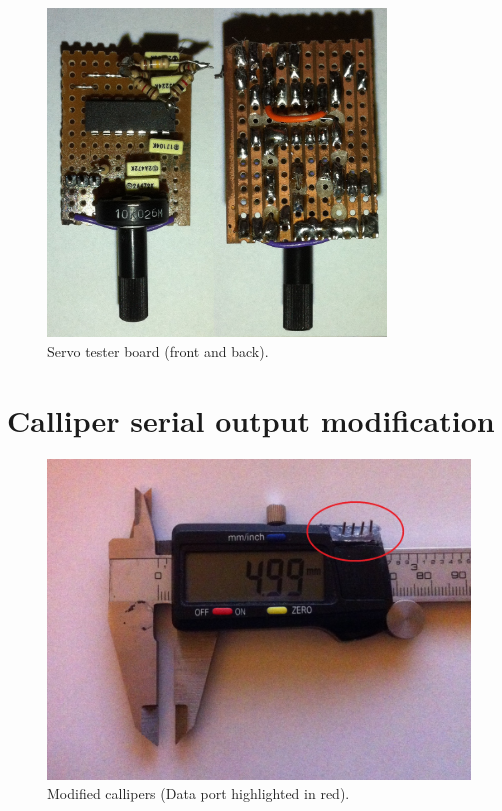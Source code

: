 \begin{figure}[ht!]
\centering
\includegraphics[width=90mm]{resources/servotester.jpg}
\caption{Servo tester board (front and back).}
\label{overflow}
\end{figure}

\newpage
\section{Calliper serial output modification}

\begin{figure}[ht!]
\centering
\includegraphics[width=150mm]{resources/callipermod.jpg}
\caption{Modified callipers (Data port highlighted in red).}
\label{overflow}
\end{figure}

